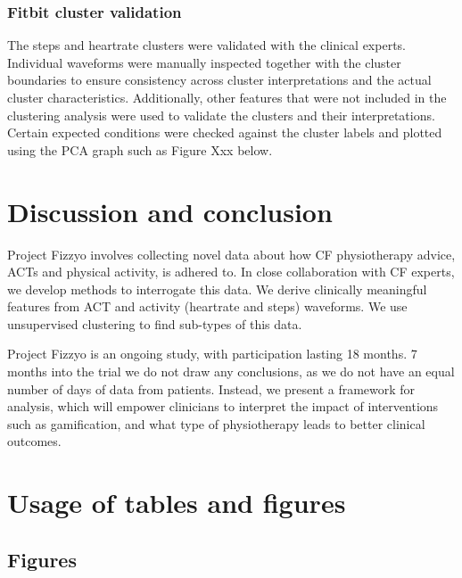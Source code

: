 \documentclass{article}
\begin{document}
\subsubsection{Fitbit cluster validation }

The steps and heartrate clusters were validated with the clinical experts. Individual waveforms were manually inspected together with the cluster boundaries to ensure consistency across cluster interpretations and the actual cluster characteristics. Additionally, other features that were not included in the clustering analysis were used to validate the clusters and their interpretations. Certain expected conditions were checked against the cluster labels and plotted using the PCA graph such as Figure Xxx below. 


\section{Discussion and conclusion} 

Project Fizzyo involves collecting novel data about how CF physiotherapy advice, ACTs and physical activity, is adhered to. In close collaboration with CF experts, we develop methods to interrogate this data. We derive clinically meaningful features from ACT and activity (heartrate and steps) waveforms. We use unsupervised clustering to find sub-types of this data. 

Project Fizzyo is an ongoing study, with participation lasting 18 months. 7 months into the trial we do not draw any conclusions, as we do not have an equal number of days of data from patients. Instead, we present a framework for analysis, which will empower clinicians to interpret the impact of interventions such as gamification, and what type of physiotherapy leads to better clinical outcomes.

\section{Usage of tables and figures}
\subsection{Figures}
\end{document}
